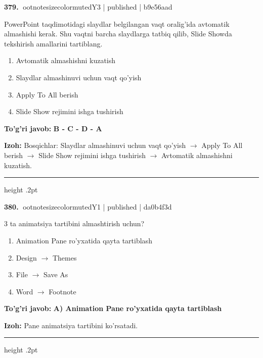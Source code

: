 \documentclass[10pt,a4paper]{article}
\begin{document}
\textbf{\color{ink}379.} {ootnotesizecolor{muted}Y3 | published | b9e56aad}
\par
PowerPoint taqdimotidagi slaydlar belgilangan vaqt oralig'ida avtomatik almashishi kerak. Shu vaqtni barcha slaydlarga tatbiq qilib, Slide Showda tekshirish amallarini tartiblang.
\begin{enumerate}[label=\Alph*),leftmargin=9mm]
\item Avtomatik almashishni kuzatish
\item Slaydlar almashinuvi uchun vaqt qo'yish
\item Apply To All berish
\item Slide Show rejimini ishga tushirish
\end{enumerate}
\begin{tcolorbox}[enhanced,breakable,colback=teal!4,colframe=teal!55!black,boxrule=0.45pt,arc=1.2mm,left=2.8mm,right=2.8mm,top=2mm,bottom=2mm]
\textbf{\color{teal}To'g'ri javob:} \textbf{B - C - D - A}
\par\smallskip
\textbf{Izoh:} Bosqichlar: Slaydlar almashinuvi uchun vaqt qo'yish \ensuremath{\rightarrow} Apply To All berish \ensuremath{\rightarrow} Slide Show rejimini ishga tushirish \ensuremath{\rightarrow} Avtomatik almashishni kuzatish.
\end{tcolorbox}
\vspace{2mm}\hrule height .2pt\vspace{2mm}

\textbf{\color{ink}380.} {ootnotesizecolor{muted}Y1 | published | da0b4f3d}
\par
3 ta animatsiya tartibini almashtirish uchun?
\begin{enumerate}[label=\Alph*),leftmargin=9mm]
\item Animation Pane ro'yxatida qayta tartiblash
\item Design \ensuremath{\rightarrow} Themes
\item File \ensuremath{\rightarrow} Save As
\item Word \ensuremath{\rightarrow} Footnote
\end{enumerate}
\begin{tcolorbox}[enhanced,breakable,colback=teal!4,colframe=teal!55!black,boxrule=0.45pt,arc=1.2mm,left=2.8mm,right=2.8mm,top=2mm,bottom=2mm]
\textbf{\color{teal}To'g'ri javob:} \textbf{A) Animation Pane ro'yxatida qayta tartiblash}
\par\smallskip
\textbf{Izoh:} Pane animatsiya tartibini ko'rsatadi.
\end{tcolorbox}
\vspace{2mm}\hrule height .2pt\vspace{2mm}
\end{document}
